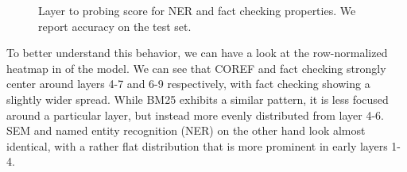 \begin{figure}[!ht]
    \centering
    \begin{subfigure}{\textwidth}
        \centering
    \end{subfigure}

    \begin{subfigure}{\textwidth}
        \centering
    \end{subfigure}

    \caption{Layer to probing score for NER and fact checking properties. We report accuracy on the test set.}
\end{figure}

To better understand this behavior, we can have a look at the row-normalized heatmap in  of the  model. We can see that COREF and fact checking strongly center around layers 4-7 and 6-9 respectively, with fact checking showing a slightly wider spread. While BM25 exhibits a similar pattern, it is less focused around a particular layer, but instead more evenly distributed from layer 4-6. SEM and named entity recognition (NER) on the other hand look almost identical, with a rather flat distribution that is more prominent in early layers 1-4.

